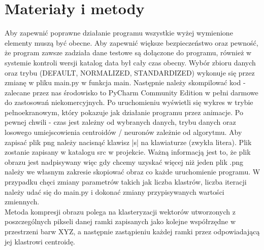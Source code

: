 \documentclass{classrep}
\begin{document}
\section{Materiały i metody}
{Aby zapewnić poprawne działanie programu wszystkie wyżej wymienione elementy muszą być obecne. Aby zapewnić większe
bezpieczeństwo oraz pewność, że program zawsze zadziała dane testowe są dołączone do programu, również w systemie
kontroli wersji katalog data był cały czas obecny. Wybór zbioru danych oraz trybu (DEFAULT, NORMALIZED, STANDARDIZED)
wykonuje się przez zmianę w pliku main.py w funkcja main. Następnie należy skompilować kod - zalecane przez nas
środowisko to PyCharm Community Edition w pełni darmowe do zastosowań niekomercyjnych. Po uruchomieniu wyświetli
się wykres w trybie pełnoekranowym, który pokazuje jak działanie programu przez animacje. Po pewnej chwili - czas
jest zależny od wybranych danych, trybu danych oraz losowego umiejscowienia centroidów / neuronów zależnie od algorytmu.
Aby zapisać plik png należy nacisnąć klawisz |s| na klawiaturze (zwykła litera). Plik zostanie zapisany w katalogu src
w projekcie. Ważną informacją jest to, że plik obrazu jest nadpisywany więc gdy chcemy uzyskać więcej niż jeden plik
.png należy we własnym zakresie skopiować obraz co każde uruchomienie programu. W przypadku chęci zmiany parametrów
takich jak liczba klastrów, liczba iteracji należy udać się do main.py i dokonać zmiany przypisywanych wartości zmiennych.\\

Metoda kompresji obrazu polega na klasteryzacji wektorów utworzonych z poszczególnych pikseli danej ramki zapisanych jako kolejne współrzędne w przestrzeni barw XYZ, a następnie zastąpieniu każdej ramki przez odpowiadającą jej klastrowi centroidę.


}
\end{document}
